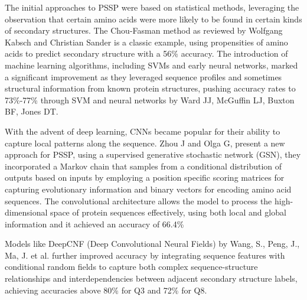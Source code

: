 \documentclass[conference]{IEEEtran}
\begin{document}
The initial approaches to PSSP were based on statistical methods, leveraging the observation that certain amino acids were more likely to be found in certain kinds of secondary structures. The Chou-Fasman method as reviewed by Wolfgang Kabsch and Christian Sander\cite{predprowolf} is a classic example, using propensities of amino acids to predict secondary structure with a 56\% accuracy. The introduction of machine learning algorithms, including SVMs and early neural networks, marked a significant improvement as they leveraged sequence profiles and sometimes structural information from known protein structures, pushing accuracy rates to 73\%-77\% through SVM and neural networks by Ward JJ, McGuffin LJ, Buxton BF, Jones DT\cite{svmsec}.

With the advent of deep learning, CNNs became popular for their ability to capture local patterns along the sequence. Zhou J and Olga G,\cite{gsndeep} present a new approach for PSSP, using a supervised generative stochastic network (GSN), they incorporated a Markov chain that samples from a conditional distribution of outputs based on inputs by employing a position specific scoring matrices for capturing evolutionary information and binary vectors for encoding amino acid sequences. The convolutional architecture allows the model to process the high-dimensional space of protein sequences effectively, using both local and global information and it achieved an accuracy of 66.4\%

Models like DeepCNF (Deep Convolutional Neural Fields) by Wang, S., Peng, J., Ma, J. et al. \cite{deepcnf} further improved accuracy by integrating sequence features with conditional random fields to capture both complex sequence-structure relationships and interdependencies between adjacent secondary structure labels, achieving accuracies above 80\% for Q3 and 72\% for Q8.
\end{document}
